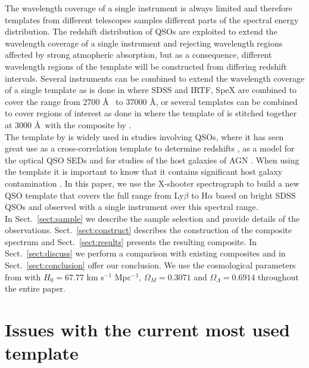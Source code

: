 \documentclass{aa}    %
\newcommand{\sectionname}{Sect.}
\newcommand{\Sect}[1]{\sectionname~\ref{sect:#1}}
\newcommand{\sect}[1]{\Sect{#1}}
\newcommand{\sectlabel}[1]{\label{sect:#1}}
\begin{document}
The wavelength coverage of a single instrument is always limited and therefore
templates from different telescopes samples different parts of the spectral energy distribution. The redshift
distribution of QSOs are exploited to extend the wavelength coverage of a
single instrument and rejecting wavelength regions affected by strong atmopheric absorption, but as a consequence, different wavelength regions of the template will be constructed from differing
redshift intervals. Several instruments can be combined to extend the wavelength
coverage of a single template as is done in \citet{Glikman2006} where SDSS \citep{Gunn2006} and IRTF, SpeX \citep{Rayner2003} are combined to
cover the range from 2700 \AA~ to 37000 \AA, or several templates can be
combined to cover regions of interest as done in \citet{Zhou2010} where the
template of \citet{VandenBerk2001} is stitched together at 3000
\AA~with the composite by \citet{Glikman2006}. \\
The template by \citet{VandenBerk2001} is widely
used in studies involving QSOs, where it has seen great use as a
cross-correlation template to determine redshifts \citep{Stoughton2002, Rafiee2011}, as a model for the optical QSO SEDs \citep{Croom2004, Hopkins2006, Hopkins2007} and for studies of the host galaxies of AGN \citep{Kauffmann2003b}. When using the \citet{VandenBerk2001} template
it is important to know that it contains significant host galaxy contamination
\citep[e.g.,][their Fig.~5]{Fynbo2013}. 
In this paper, we use the X-shooter spectrograph to build a new QSO template that covers the full range from Ly$\beta$ to H$\alpha$ based on bright
SDSS QSOs and observed with a single instrument over this spectral range. \\
In \sect{sample} we describe the sample selection and provide details 
of the observations. \sect{construct} describes the construction of the composite spectrum
and \sect{results} presents the resulting composite. In \sect{discuss} we perform a comparison with existing composites and in \sect{conclusion} offer our conclusion. We use the cosmological parameters from \citet{Planck2014} with $H_{0} = 67.77$ km s$^{-1}$ Mpc$^{-1}$, $\Omega_{M} = 0.3071$ and $\Omega_{\Lambda} = 0.6914$ throughout the entire paper. 




\section{Issues with the current most used template}   \sectlabel{problem}
\end{document}

